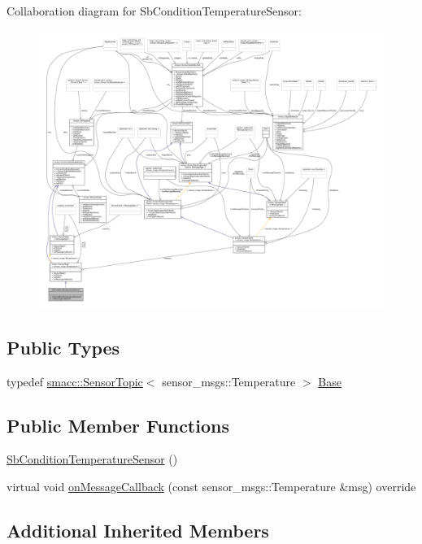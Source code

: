 Collaboration diagram for Sb\+Condition\+Temperature\+Sensor\+:
\nopagebreak
\begin{figure}[H]
\begin{center}
\leavevmode
\includegraphics[width=350pt]{classSbConditionTemperatureSensor__coll__graph}
\end{center}
\end{figure}
\subsection*{Public Types}
\begin{DoxyCompactItemize}
\item 
typedef \hyperlink{classsmacc_1_1SensorTopic}{smacc\+::\+Sensor\+Topic}$<$ sensor\+\_\+msgs\+::\+Temperature $>$ \hyperlink{classSbConditionTemperatureSensor_a5067362cd6c37e58f8f5f012b8a731fe}{Base}
\end{DoxyCompactItemize}
\subsection*{Public Member Functions}
\begin{DoxyCompactItemize}
\item 
\hyperlink{classSbConditionTemperatureSensor_aec2f9af020755424f3f961d5f87c3ac8}{Sb\+Condition\+Temperature\+Sensor} ()
\item 
virtual void \hyperlink{classSbConditionTemperatureSensor_a0bacff918eeb167bd115c4d8041c3055}{on\+Message\+Callback} (const sensor\+\_\+msgs\+::\+Temperature \&msg) override
\end{DoxyCompactItemize}
\subsection*{Additional Inherited Members}


